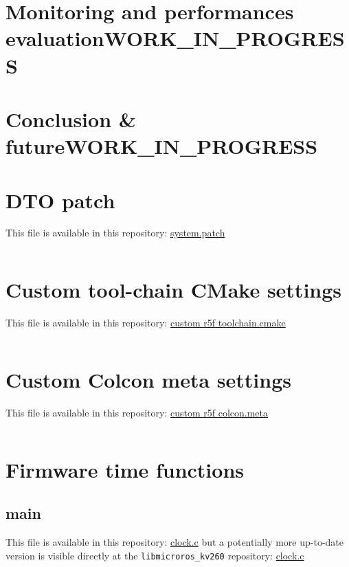 \documentclass[10pt]{article}
\begin{document}
\section{Monitoring and performances evaluation\hfill{}\textsc{WORK\_IN\_PROGRESS}}
\label{sec:org494e44f}

\clearpage
\section{Conclusion \& future\hfill{}\textsc{WORK\_IN\_PROGRESS}}
\label{sec:org127e2e5}

\clearpage
\appendix
\section{DTO patch}
\label{sec:org731fdfb}
This file is available in this repository: \href{https://gitlab.com/sunoc/xilinx-kria-kv260-documentation/-/blob/b7300116e153f4b5a1542f8804e4646db8030033/src/system.patch}{system.patch}
\inputminted[linenos, frame=single]{diff}{./src/system.patch}

\clearpage
\section{Custom tool-chain CMake settings}
\label{sec:orgc028b26}
This file is available in this repository: \href{https://gitlab.com/sunoc/xilinx-kria-kv260-documentation/-/blob/b7300116e153f4b5a1542f8804e4646db8030033/src/custom\_r5f\_toolchain.cmake}{custom r5f toolchain.cmake}
\inputminted[linenos, frame=single]{cmake}{./src/custom_r5f_toolchain.cmake}

\clearpage
\section{Custom Colcon meta settings}
\label{sec:org8110b30}
This file is available in this repository: \href{https://gitlab.com/sunoc/xilinx-kria-kv260-documentation/-/blob/b7300116e153f4b5a1542f8804e4646db8030033/src/custom\_r5f\_colcon.meta}{custom r5f colcon.meta}
\inputminted[linenos, frame=single]{yaml}{./src/custom_r5f_colcon.meta}

\clearpage
\section{Firmware time functions}
\label{sec:orge8646b1}

\subsection{main}
\label{sec:org830ed90}
This file is available in this repository: \href{https://gitlab.com/sunoc/xilinx-kria-kv260-documentation/-/blob/b7300116e153f4b5a1542f8804e4646db8030033/src/clock.c}{clock.c}
but a potentially more up-to-date version is visible
directly at the \texttt{libmicroros\_kv260} repository: \href{https://gitlab.com/sunoc/libmicroros\_kv260/-/blob/4867e762f66af7b4647232eb4c0a31106db66e13/src/clock.c}{clock.c}
\end{document}
